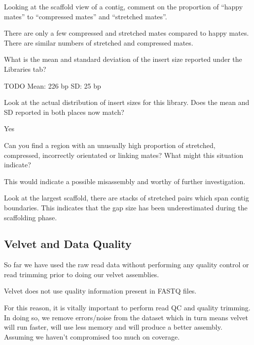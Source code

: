 \begin{questions}
Looking at the scaffold view of a contig, comment on the proportion of ``happy
mates'' to ``compressed mates'' and ``stretched mates''.
\begin{answer}
There are only a few compressed and stretched mates compared to happy mates.
There are similar numbers of stretched and compressed mates.
\end{answer}

What is the mean and standard deviation of the insert size reported under the
Libraries tab?
\begin{answer}
TODO
Mean: 226 bp
SD: 25 bp
\end{answer}

Look at the actual distribution of insert sizes for this library. Does the mean
and SD reported in both places now match?
\begin{answer}
Yes
\end{answer}

Can you find a region with an unusually high proportion of stretched, compressed,
incorrectly orientated or linking mates? What might this situation indicate?
\begin{answer}
This would indicate a possible misassembly and worthy of further investigation.

Look at the largest scaffold, there are stacks of stretched pairs which span
contig boundaries. This indicates that the gap size has been underestimated
during the scaffolding phase.
\end{answer}
\end{questions}


\subsection{Velvet and Data Quality}
So far we have used the raw read data without performing any quality control or
read trimming prior to doing our velvet assemblies.

\begin{warning}
Velvet does not use quality information present in FASTQ files.
\end{warning}

For this reason, it is vitally important to perform read QC and quality
trimming. In doing so, we remove errors/noise from the dataset which in turn
means velvet will run faster, will use less memory and will produce a better
assembly. Assuming we haven't compromised too much on coverage.

